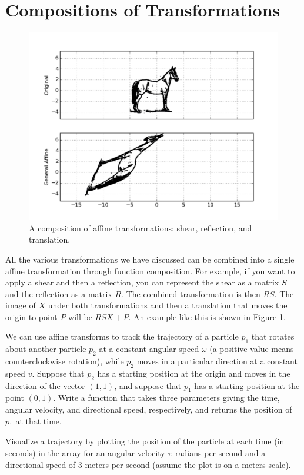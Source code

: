 \section*{Compositions of Transformations}
\begin{figure}
\centering
\includegraphics[width=\textwidth]{combo.pdf}
\caption{
A composition of affine transformations: shear, reflection, and translation.}
\label{basis:combo}
\end{figure}
All the various transformations we have discussed can be combined into a single affine transformation through function composition.
For example, if you want to apply a shear and then a reflection, you can represent the
shear as a matrix $S$ and the reflection as a matrix $R$. The combined transformation is then $RS$.
The image of $X$ under both transformations and then a translation that moves the origin to point $P$ will be $RSX+P$.
An example like this is shown in Figure \ref{basis:combo}.

\begin{problem}
We can use affine transforms to track the trajectory of a particle $p_1$ that rotates about
another particle $p_2$ at a constant angular speed $\omega$ (a positive value means
counterclockwise rotation), while $p_2$ moves in a particular
direction at a constant speed $v$. Suppose that $p_2$ has a starting position at the origin and
moves in the direction of the vector $(1, 1)$, and suppose that $p_1$ has a starting position
at the point $(0,1)$. Write a function that takes three parameters giving the time, angular
velocity, and directional speed, respectively, and returns the position of $p_1$ at that time.

Visualize a trajectory by plotting the position of the particle at each time (in seconds) in the array
 for an angular velocity $\pi$ radians per second and a
directional speed of 3 meters per second (assume the plot is on a meters scale).
\end{problem}


